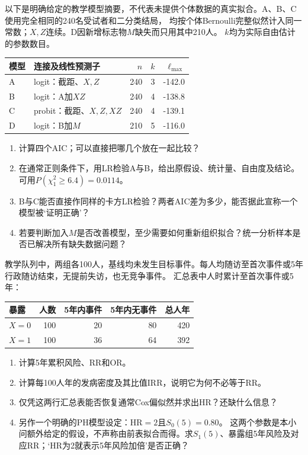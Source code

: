 以下是明确给定的教学模型摘要，不代表未提供个体数据的真实拟合。A、B、C使用完全相同的240名受试者和二分类结局，
均按个体Bernoulli完整似然计入同一常数；$X,Z$连续。D因新增标志物$M$缺失而只用其中210人。
$k$均为实际自由估计的参数数目。
\begin{center}\small\begin{tabular}{llrrr}\toprule
模型&连接及线性预测子&$n$&$k$&$\ell_{\max}$\\\midrule
A&logit：截距、$X,Z$&240&3&-142.0\\
B&logit：A加$XZ$&240&4&-138.8\\
C&probit：截距、$X,Z,XZ$&240&4&-139.1\\
D&logit：B加$M$&210&5&-116.0\\\bottomrule\end{tabular}\end{center}
\begin{enumerate}
\item 计算四个AIC；可以直接把哪几个放在一起比较？
\item 在通常正则条件下，用LR检验A与B，给出原假设、统计量、自由度及结论。可用$P(\chi^2_1\ge6.4)=0.0114$。
\item B与C能否直接作同样的卡方LR检验？两者AIC差为多少，能否据此宣称一个模型被‘证明正确’？
\item 若要判断加入$M$是否改善模型，至少需要如何重新组织拟合？统一分析样本是否已解决所有缺失数据问题？
\end{enumerate}

教学队列中，两组各100人，基线均未发生目标事件。每人均随访至首次事件或5年行政随访结束，无提前失访，也无竞争事件。
汇总表中人时累计至首次事件或5年：
\begin{center}\begin{tabular}{lrrrr}\toprule
暴露&人数&5年内事件&5年内无事件&总人年\\\midrule
$X=0$&100&20&80&420\\$X=1$&100&36&64&392\\\bottomrule\end{tabular}\end{center}
\begin{enumerate}
\item 计算5年累积风险、RR和OR。
\item 计算每100人年的发病密度及其比值IRR，说明它为何不必等于RR。
\item 仅凭这两行汇总表能否恢复通常Cox偏似然并求出HR？还缺什么信息？
\item 另作一个明确的PH模型设定：$\mathrm{HR}=2$且$S_0(5)=0.80$。
这两个参数是本小问额外给定的假设，不声称由前表拟合而得。求$S_1(5)$、暴露组5年风险及对应RR；‘HR为2就表示5年风险加倍’是否正确？
\end{enumerate}

